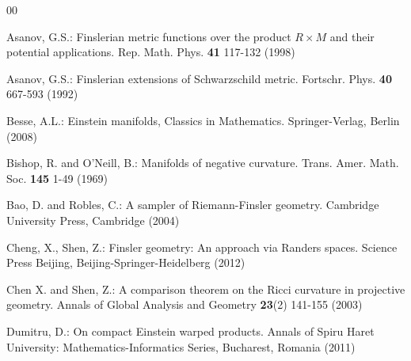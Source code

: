 \documentclass[pdflatex,sn-mathphys-num]{sn-jnl}%
\theoremstyle{thmstyleone}%
\theoremstyle{thmstyletwo}%
\theoremstyle{thmstylethree}%
\begin{document}
\begin{thebibliography}{00}


 Asanov, G.S.:  Finslerian metric functions over the product $R\times M$ and their potential applications. Rep. Math. Phys. {\bf41} 117-132 (1998)
		
		 Asanov, G.S.:  Finslerian extensions of Schwarzschild metric. Fortschr. Phys. {\bf40} 667-593 (1992)
		
		 Besse, A.L.: Einstein manifolds, Classics in Mathematics. Springer-Verlag, Berlin (2008)
  
  
		 Bishop, R. and O'Neill, B.:  Manifolds of negative curvature. Trans. Amer. Math. Soc. {\bf145} 1-49 (1969)
  
		 Bao, D. and Robles, C.: A sampler of Riemann-Finsler geometry. Cambridge University Press, Cambridge (2004)

          Cheng, X., Shen, Z.: Finsler geometry: An approach via Randers spaces. Science Press Beijing, Beijing-Springer-Heidelberg (2012)

  
		 Chen X. and Shen, Z.:  A comparison theorem on the Ricci curvature in projective geometry. Annals of Global Analysis and Geometry {\bf23}(2) 141-155 (2003)
  
		 Dumitru, D.:  On compact Einstein warped products. Annals of Spiru Haret University: Mathematics-Informatics Series, Bucharest, Romania (2011)
  
  

\end{thebibliography}
\end{document}
